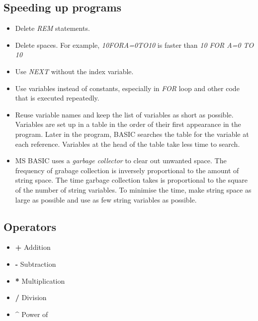     \subsection{Speeding up programs}

    \begin{itemize}
        \item Delete \textit{REM} statements.
        \item Delete spaces. For example, \textit{10FORA=0TO10} is faster than
        \textit{10 FOR A=0 TO 10}
        \item Use \textit{NEXT} without the index variable.
        \item Use variables instead of constants, especially in \textit{FOR}
        loop and other code that is executed repeatedly.
        \item Reuse variable names and keep the list of variables as short as
        possible. Variables are set up in a table in the order of their first
        appearance in the program. Later in the program, BASIC searches the
        table for the variable at each reference. Variables at the head of the
        table take less time to search.
        \item MS BASIC uses a \textit{garbage collector} to clear out unwanted 
        space. The frequency of grabage collection is inversely proportional to
        the amount of string space. The time garbage collection takes is
        proportional to the square of the number of string variables. To
        minimise the time, make string space as large as possible and use as few
        string variables as possible.
    \end{itemize}

    \subsection{Operators}

    \begin{itemize}
        \item \textbf{+} Addition
        \item \textbf{-} Subtraction
        \item \textbf{*} Multiplication
        \item \textbf{/} Division
        \item \textbf{\textasciicircum} Power of
    \end{itemize}


